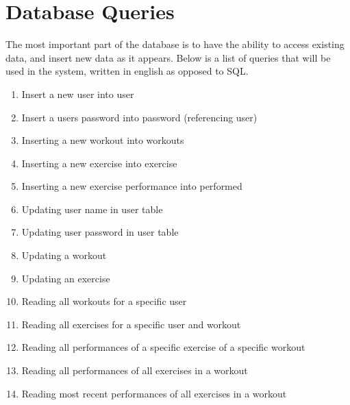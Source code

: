 \documentclass{article}
\begin{document}
\section{Database Queries}

The most important part of the database is to have the ability to access existing data, and insert new data as it appears. Below is a list of queries that will be used in the system, written in english as opposed to SQL.

\begin{enumerate}
    \item {Insert a new user into user}
    \item {Insert a users password into password (referencing user)}
    \item {Inserting a new workout into workouts}
    \item {Inserting a new exercise into exercise}
    \item {Inserting a new exercise performance into performed}
    \item {Updating user name in user table}
    \item {Updating user password in user table}
    \item {Updating a workout}
    \item {Updating an exercise}
    \item {Reading all workouts for a specific user}
    \item {Reading all exercises for a specific user and workout}
    \item {Reading all performances of a specific exercise of a specific workout}
    \item {Reading all performances of all exercises in a workout}
    \item {Reading most recent performances of all exercises in a workout}
\end{enumerate}
\end{document}
